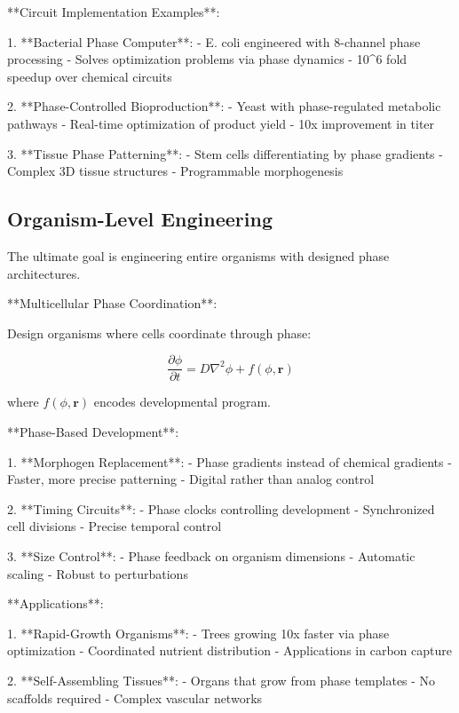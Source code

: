 \documentclass[12pt,a4paper]{report}
\begin{document}
**Circuit Implementation Examples**:

1. **Bacterial Phase Computer**:
   - E. coli engineered with 8-channel phase processing
   - Solves optimization problems via phase dynamics
   - 10^6 fold speedup over chemical circuits

2. **Phase-Controlled Bioproduction**:
   - Yeast with phase-regulated metabolic pathways
   - Real-time optimization of product yield
   - 10x improvement in titer

3. **Tissue Phase Patterning**:
   - Stem cells differentiating by phase gradients
   - Complex 3D tissue structures
   - Programmable morphogenesis

\subsection{Organism-Level Engineering}

The ultimate goal is engineering entire organisms with designed phase architectures.

**Multicellular Phase Coordination**:

Design organisms where cells coordinate through phase:

\begin{equation}
\frac{\partial \phi}{\partial t} = D \nabla^2 \phi + f(\phi, \mathbf{r})
\end{equation}

where $f(\phi, \mathbf{r})$ encodes developmental program.

**Phase-Based Development**:

1. **Morphogen Replacement**:
   - Phase gradients instead of chemical gradients
   - Faster, more precise patterning
   - Digital rather than analog control

2. **Timing Circuits**:
   - Phase clocks controlling development
   - Synchronized cell divisions
   - Precise temporal control

3. **Size Control**:
   - Phase feedback on organism dimensions
   - Automatic scaling
   - Robust to perturbations

**Applications**:

1. **Rapid-Growth Organisms**:
   - Trees growing 10x faster via phase optimization
   - Coordinated nutrient distribution
   - Applications in carbon capture

2. **Self-Assembling Tissues**:
   - Organs that grow from phase templates
   - No scaffolds required
   - Complex vascular networks
\end{document}

